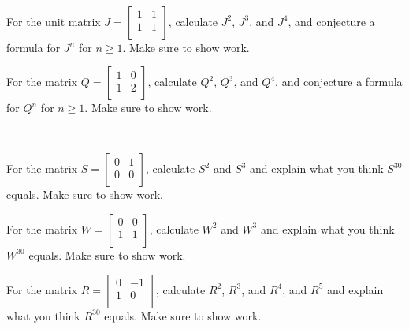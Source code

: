 \begin{exer}[\exerU] %
\label{exer_power_matrix_exponentials}
~
    \begin{exerpart}
        \item For the unit matrix $J=\left[ \begin{array}{cc} 1 & 1 \\ 1 & 1 \\ \end{array} \right]$, calculate $J^2$, $J^3$, and $J^4$, and conjecture a formula for $J^n$ for $n \ge 1$.  Make sure to show work. %
       \item For the matrix $Q=\left[ \begin{array}{cc} 1 & 0 \\ 1 & 2 \\ \end{array} \right]$, calculate $Q^2$, $Q^3$, and $Q^4$, and conjecture a formula for $Q^n$ for $n \ge 1$.  Make sure to show work. %
   \end{exerpart}
\end{exer}

\begin{exer}[\exerU] %
\label{exer_power_rotation_matrix}
~   
    \begin{exerpart}
        \item For the matrix $S=\left[ \begin{array}{cc} 0 & 1 \\ 0 & 0 \\ \end{array} \right]$, calculate $S^2$ and $S^3$ and explain what you think $S^{30}$ equals. Make sure to show work. 
        \item For the matrix $W=\left[ \begin{array}{cc} 0 & 0 \\ 1 & 1 \\ \end{array} \right]$, calculate $W^2$ and $W^3$ and explain what you think $W^{30}$ equals. Make sure to show work. 
        \item For the matrix $R=\left[ \begin{array}{cc} 0 & -1 \\ 1 & 0 \\ \end{array} \right]$, calculate $R^2$, $R^3$, and $R^4$, and $R^5$ and explain what you think $R^{30}$ equals. Make sure to show work.
    \end{exerpart} 
\end{exer}

